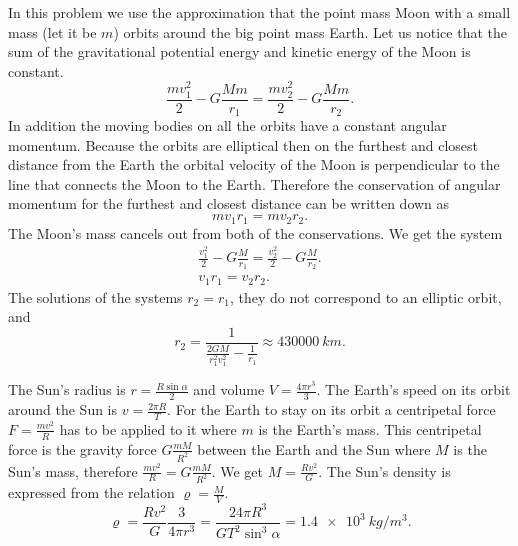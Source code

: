 \documentclass[11pt]{article}
\begin{document}
\solueng
In this problem we use the approximation that the point mass Moon with a small mass (let it be $m$) orbits around the big point mass Earth. Let us notice that the sum of the gravitational potential energy and kinetic energy of the Moon is constant. 
$$
\frac{mv_1^2}{2}-G\frac{Mm}{r_1}=\frac{mv_2^2}{2}-G\frac{Mm}{r_2}.
$$
In addition the moving bodies on all the orbits have a constant angular momentum. Because the orbits are elliptical then on the furthest and closest distance from the Earth the orbital velocity of the Moon is perpendicular to the line that connects the Moon to the Earth. Therefore the conservation of angular momentum for the furthest and closest distance can be written down as
$$
mv_1r_1=mv_2r_2.
$$
The Moon’s mass cancels out from both of the conservations. We get the system
$$
\begin{array}{c} 
\frac{v_1^2}{2}-G\frac{M}{r_1}=\frac{v_2^2}{2}-G\frac{M}{r_2}.\\
v_1r_1=v_2r_2.
\end{array}
$$
The solutions of the systems $r_2=r_1$, they do not correspond to an elliptic orbit, and
$$r_2=\frac{1}{\frac{2GM}{r_1^2v_1^2}-\frac{1}{r_1}}\approx\SI{430000}{km}.$$
\probend
\bigskip


\solueng
The Sun’s radius is $r=\frac{R\sin\alpha}{2}$ and volume $V=\frac{4\pi r^3}{3}$. The Earth’s speed on its orbit around the Sun is $v=\frac{2\pi R}{T}$. For the Earth to stay on its orbit a centripetal force $F=\frac{mv^2}{R}$ has to be applied to it where $m$ is the Earth’s mass. This centripetal force is the gravity force $G\frac{mM}{R^2}$ between the Earth and the Sun where $M$ is the Sun’s mass, therefore $\frac{mv^2}{R}=G\frac{mM}{R^2}$. We get $M=\frac{Rv^2}{G}$. The Sun’s density is expressed from the relation $\varrho=\frac{M}{V}$. 
$$\varrho=\frac{Rv^2}{G} \frac{3}{4\pi r^3}=\frac{24 \pi R^3}{G T^2 \sin^3 \alpha}=\SI{1,4e3}{kg/m^3}.$$
\probend
\bigskip

\end{document}

